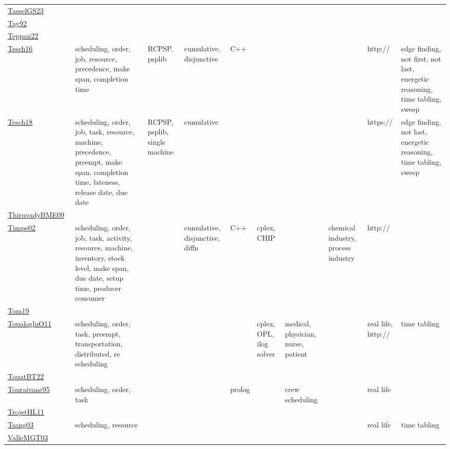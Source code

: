{\begin{longtable}{p{3cm}p{4cm}p{2cm}p{2cm}p{2cm}p{2cm}p{2cm}p{2cm}p{2cm}p{2cm}}
\href{papers/TasselGS23.pdf}{TasselGS23}~\cite{TasselGS23} &  &  &  &  &  &  &  &  & \\
\href{articles/Tay92.pdf}{Tay92}~\cite{Tay92} &  &  &  &  &  &  &  &  & \\
\href{papers/Teppan22.pdf}{Teppan22}~\cite{Teppan22} &  &  &  &  &  &  &  &  & \\
\href{papers/Tesch16.pdf}{Tesch16}~\cite{Tesch16} & scheduling, order, job, resource, precedence, make span, completion time & RCPSP, psplib & cumulative, disjunctive &  C++  &  &  &  & http:// & edge finding, not first, not last, energetic reasoning, time tabling, sweep\\
\href{papers/Tesch18.pdf}{Tesch18}~\cite{Tesch18} & scheduling, order, job, task, resource, machine, precedence, preempt, make span, completion time, lateness, release date, due date & RCPSP, psplib, single machine & cumulative &  &  &  &  & https:// & edge finding, not last, energetic reasoning, time tabling, sweep\\
\href{papers/ThiruvadyBME09.pdf}{ThiruvadyBME09}~\cite{ThiruvadyBME09} &  &  &  &  &  &  &  &  & \\
\href{articles/Timpe02.pdf}{Timpe02}~\cite{Timpe02} & scheduling, order, job, task, activity, resource, machine, inventory, stock level, make span, due date, setup time, producer consumer &  & cumulative, disjunctive, diffn &  C++  & cplex, CHIP &  & chemical industry, process industry & http:// & \\
\href{papers/Tom19.pdf}{Tom19}~\cite{Tom19} &  &  &  &  &  &  &  &  & \\
\href{articles/TopalogluO11.pdf}{TopalogluO11}~\cite{TopalogluO11} & scheduling, order, task, preempt, transportation, distributed, re scheduling &  &  &  & cplex, OPL, ilog solver & medical, physician, nurse, patient &  & real life, http:// & time tabling\\
\href{papers/TouatBT22.pdf}{TouatBT22}~\cite{TouatBT22} &  &  &  &  &  &  &  &  & \\
\href{papers/Touraivane95.pdf}{Touraivane95}~\cite{Touraivane95} & scheduling, order, task &  &  & prolog &  & crew scheduling &  & real life & \\
\href{articles/TrojetHL11.pdf}{TrojetHL11}~\cite{TrojetHL11} &  &  &  &  &  &  &  &  & \\
\href{articles/Tsang03.pdf}{Tsang03}~\cite{Tsang03} & scheduling, resource &  &  &  &  &  &  & real life & time tabling\\
\href{papers/ValleMGT03.pdf}{ValleMGT03}~\cite{ValleMGT03} &  &  &  &  &  &  &  &  & \\

\end{longtable}}

